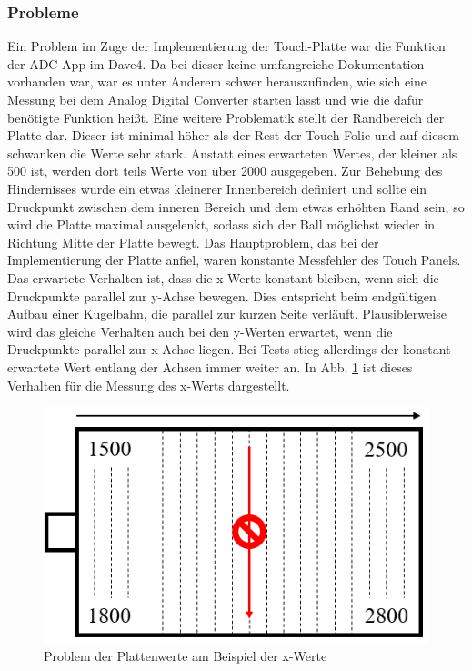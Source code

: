 \documentclass[12pt,a4paper,bibliography=totoc,listof=totoc]{scrartcl}
\begin{document}
\subsubsection{Probleme} \label{subsec:ProblemePlatte}
Ein Problem im Zuge der Implementierung der Touch-Platte war die Funktion der ADC-App im Dave4. Da bei dieser keine umfangreiche Dokumentation vorhanden war, war es unter Anderem schwer herauszufinden, wie sich eine Messung bei dem Analog Digital Converter starten lässt und wie die dafür benötigte Funktion heißt. \newline
Eine weitere Problematik stellt der Randbereich der Platte dar. Dieser ist minimal höher als der Rest der Touch-Folie und auf diesem schwanken die Werte sehr stark. Anstatt eines erwarteten Wertes, der kleiner als 500 ist, werden dort teils Werte von über 2000 ausgegeben. Zur Behebung des Hindernisses wurde ein etwas kleinerer Innenbereich definiert und sollte ein Druckpunkt zwischen dem inneren Bereich und dem etwas erhöhten Rand sein, so wird die Platte maximal ausgelenkt, sodass sich der Ball möglichst wieder in Richtung Mitte der Platte bewegt.
Das Hauptproblem, das bei der Implementierung der Platte anfiel, waren konstante Messfehler des Touch Panels. Das erwartete Verhalten ist, dass die x-Werte konstant bleiben, wenn sich die Druckpunkte parallel zur y-Achse bewegen. Dies entspricht beim endgültigen Aufbau einer Kugelbahn, die parallel zur kurzen Seite verläuft. Plausiblerweise wird das gleiche Verhalten auch bei den y-Werten erwartet, wenn die Druckpunkte parallel zur x-Achse liegen.
Bei Tests stieg allerdings der konstant erwartete Wert entlang der Achsen immer weiter an. In Abb. \ref{fig:ProblemPlattenwerte} ist dieses Verhalten für die Messung des x-Werts dargestellt.
\begin{figure}[htbp]
	\centering
	\includegraphics[scale = 0.5]{pics/ProblemPlattenwerte}
	\caption{Problem der Plattenwerte am Beispiel der x-Werte}
	\label{fig:ProblemPlattenwerte}
\end{figure}
\end{document}
